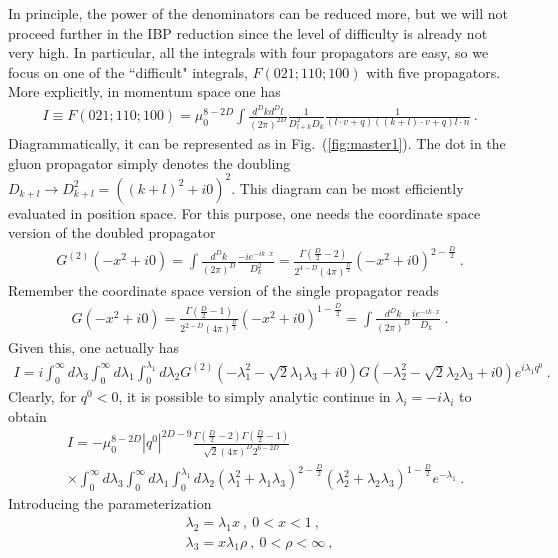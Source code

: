\documentclass[a4paper,11pt]{article}
\begin{document}
In principle, the power of the denominators can be reduced more, but we will not proceed further in the IBP reduction since the level of difficulty is already not very high. In particular, all the integrals with four propagators are easy, so we focus on one of the ``difficult" integrals, $F(021;110;100)$ with five propagators. More explicitly, in momentum space one has 
\begin{align}
I\equiv F(021;110;100)=\mu_0^{8-2D}\int\frac{d^Dkd^Dl}{(2\pi)^{2D}}\frac{1}{D_{l+k}^2D_k}\frac{1}{(l\cdot v+q)((k+l)\cdot v+q)l\cdot n} \ .
\end{align}
Diagrammatically, it can be represented as in Fig.~(\ref{fig:master1}). The dot in the gluon propagator simply denotes the doubling $D_{k+l} \rightarrow D_{k+l}^2=((k+l)^2+i0)^2$. This diagram can be most efficiently evaluated in position space. For this purpose, one needs the coordinate space version of the doubled propagator
\begin{align}
G^{(2)}(-x^2+i0)=\int \frac{d^Dk}{(2\pi)^D}\frac{-ie^{-ik\cdot x}}{D_k^2}=\frac{\Gamma(\frac{D}{2}-2)}{2^{4-D}(4\pi)^{\frac{D}{2}}}(-x^2+i0)^{2-\frac{D}{2}} \ .
\end{align}
Remember the coordinate space version of the single propagator reads
\begin{align}
G(-x^2+i0)=\frac{\Gamma(\frac{D}{2}-1)}{2^{2-D}(4\pi)^{\frac{D}{2}}}(-x^2+i0)^{1-\frac{D}{2}}=\int \frac{d^Dk}{(2\pi)^D}\frac{ie^{-ik\cdot x}}{D_k} \ .
\end{align}
Given this, one actually has 
\begin{align}
I=i\int_{0}^{\infty} d\lambda_3 \int_{0}^{\infty} d\lambda_1 \int_{0}^{\lambda_1} d\lambda_2 G^{(2)}(-\lambda_1^2-\sqrt{2}\lambda_1\lambda_3 +i0)G(-\lambda_2^2-\sqrt{2}\lambda_2\lambda_3 +i0)e^{i\lambda_1q^0} \ .
\end{align}
Clearly, for $q^0<0$, it is possible to simply analytic continue in $\lambda_i=-i\lambda_{i}$ to obtain
\begin{align}\label{eq:defI}
&I=-\mu_0^{8-2D}|q^0|^{2D-9}\frac{\Gamma(\frac{D}{2}-2)\Gamma(\frac{D}{2}-1)}{\sqrt{2}(4\pi)^D2^{6-2D}}\nonumber \\ 
& \times \int_{0}^{\infty} d\lambda_3 \int_{0}^{\infty} d\lambda_1 \int_{0}^{\lambda_1} d\lambda_2 (\lambda_1^2+\lambda_1\lambda_3)^{2-\frac{D}{2}}(\lambda_2^2 +\lambda_2\lambda_3)^{1-\frac{D}{2}}e^{-\lambda_1} \ .
\end{align}
Introducing the parameterization 
\begin{align}
\lambda_2=\lambda_1 x \ ,  \ 0<x<1 \ , \\ 
\lambda_3=x\lambda_1 \rho \ , \ 0<\rho<\infty \ ,
\end{align}
\end{document}
